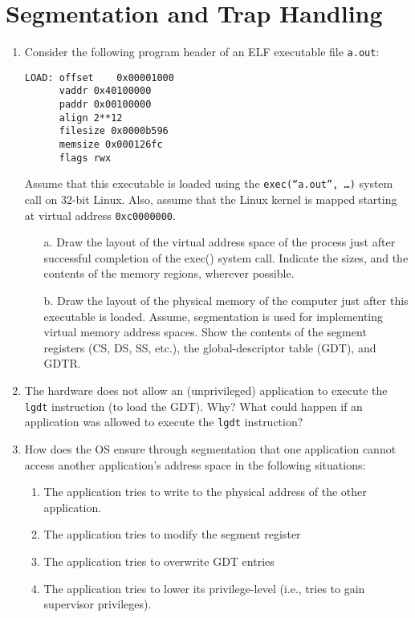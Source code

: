 \section{Segmentation and Trap Handling}
\label{sec:segmentation}
\begin{enumerate}
\item
Consider the following program header of an ELF executable file {\tt a.out}:
\begin{verbatim}
LOAD: offset    0x00001000
      vaddr 0x40100000
      paddr 0x00100000
      align 2**12
      filesize 0x0000b596
      memsize 0x000126fc
      flags rwx
\end{verbatim}
Assume that this executable is loaded using the {\tt exec(“a.out”, …)} system call on 32-bit Linux.
Also, assume that the Linux kernel is mapped starting at virtual address {\tt 0xc0000000}.
\begin{enumerate}
\item[a.] Draw the layout of
the virtual address space of the process just after successful completion of
the exec() system call. Indicate the sizes, and the contents of the memory regions, wherever possible.
\item[b.] Draw the layout of the physical memory of the computer just after this
executable is loaded. Assume, segmentation is used for implementing virtual memory address
spaces. Show the contents of the segment registers (CS, DS, SS, etc.),
the global-descriptor table (GDT), and
GDTR.
\end{enumerate}

\item The hardware does not allow an (unprivileged)
application to execute the {\tt lgdt} instruction (to load
the GDT). Why? What could happen if an application was allowed to execute the {\tt lgdt} instruction?

\item How does the OS ensure through segmentation that one application cannot access another
application's address space in the following situations:
\begin{enumerate}
\item The application tries to write to the physical address of the other application.
\item The application tries to modify the segment register
\item The application tries to overwrite GDT entries
\item The application tries to lower its privilege-level (i.e., tries to gain supervisor privileges).
\end{enumerate}


\end{enumerate}
